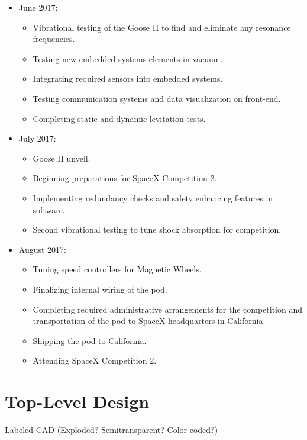 \documentclass[main.tex]{subfiles}
\begin{document}
\begin{flushleft}
\begin{itemize}
\item June 2017:
\begin{itemize}
    \item Vibrational testing of the Goose II to find and eliminate any resonance frequencies.
    \item Testing new embedded systems elements in vacuum.
    \item Integrating required sensors into embedded systems.
    \item Testing communication systems and data visualization on front-end.
    \item Completing static and dynamic levitation tests.
\end{itemize}

\item July 2017:
\begin{itemize}
    \item Goose II unveil.
    \item Beginning preparations for SpaceX Competition 2.
    \item Implementing redundancy checks and safety enhancing features in software.
    \item Second vibrational testing to tune shock absorption for competition.
\end{itemize}

\item August 2017:
\begin{itemize}
    \item Tuning speed controllers for Magnetic Wheels.
    \item Finalizing internal wiring of the pod.
    \item Completing required administrative arrangements for the competition and transportation of the pod to SpaceX headquarters in California.
    \item Shipping the pod to California.
    \item Attending SpaceX Competition 2.
\end{itemize}

\end{itemize}

\chapter{Top-Level Design}
Labeled CAD (Exploded? Semitransparent? Color coded?)\\


\end{flushleft}
\end{document}
